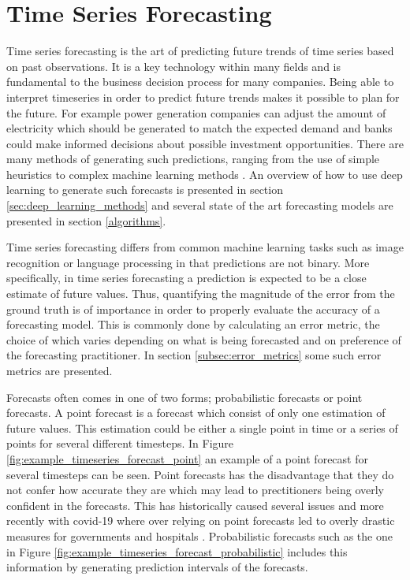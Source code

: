 \section{Time Series Forecasting}
\label{sec_time_series_forecasting}
Time series forecasting is the art of predicting future trends of time series based on past observations. It is a key technology within many fields and is fundamental to the business decision process for many companies. Being able to interpret timeseries in order to predict future trends makes it possible to plan for the future. For example power generation companies can adjust the amount of electricity which should be generated to match the expected demand and banks could make informed decisions about possible investment opportunities. There are many methods of generating such predictions, ranging from the use of simple heuristics to complex machine learning methods \cite{hyndman_forecasting_3rd}. An overview of how to use deep learning to generate such forecasts is presented in section \ref{sec:deep_learning_methods} and several state of the art forecasting models are presented in section \ref{algorithms}.

Time series forecasting differs from common machine learning tasks such as image recognition or language processing in that predictions are not binary. More specifically, in time series forecasting a prediction is expected to be a close estimate of future values. Thus, quantifying the magnitude of the error from the ground truth is of importance in order to properly evaluate the accuracy of a forecasting model. This is commonly done by calculating an error metric, the choice of which varies depending on what is being forecasted and on preference of the forecasting practitioner. \cite{hyndman_forecasting_3rd,hyndman_measuring_nodate, willmott_advantages_2005} In section \ref{subsec:error_metrics} some such error metrics are presented.

Forecasts often comes in one of two forms; probabilistic forecasts or point forecasts. A point forecast is a forecast which consist of only one estimation of future values. This estimation could be either a single point in time or a series of points for several different timesteps. In Figure \ref{fig:example_timeseries_forecast_point} an example of a point forecast for several timesteps can be seen. Point forecasts has the disadvantage that they do not confer how accurate they are which may lead to prectitioners being overly confident in the forecasts. This has historically caused several issues and more recently with covid-19 where over relying on point forecasts led to overly drastic measures for governments and hospitals \cite{IOANNIDIS2020}. Probabilistic forecasts such as the one in Figure \ref{fig:example_timeseries_forecast_probabilistic} includes this information by generating prediction intervals of the forecasts.

